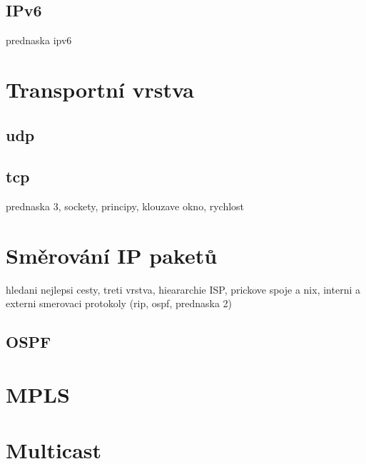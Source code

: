 \subsection{IPv6}
prednaska ipv6



\section{Transportní vrstva}

\subsection{udp}

\subsection{tcp}
prednaska 3, sockety, principy, klouzave okno, rychlost



\section{Směrování IP paketů}
hledani nejlepsi cesty, treti vrstva, hieararchie ISP, prickove spoje a nix, interni a externi smerovaci protokoly (rip, ospf, prednaska 2)
\subsection{OSPF}



\section{MPLS}



\section{Multicast}


















